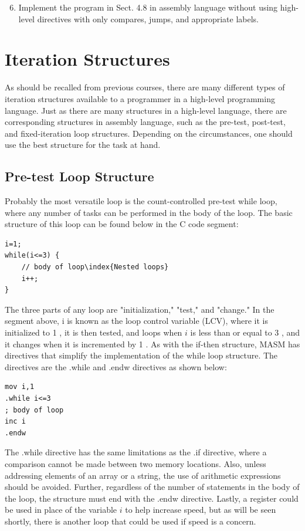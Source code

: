 \documentclass[10pt]{book}
\begin{document}
\begin{enumerate}
  \setcounter{enumi}{5}
  \item Implement the program in Sect. 4.8 in assembly language without using high-level directives with only compares, jumps, and appropriate labels.
\end{enumerate}

\chapter{Iteration Structures}

As should be recalled from previous courses, there are many different types of iteration structures available to a programmer in a high-level programming language. Just as there are many structures in a high-level language, there are corresponding structures in assembly language, such as the pre-test, post-test, and fixed-iteration loop structures. Depending on the circumstances, one should use the best structure for the task at hand.

\section{Pre-test Loop Structure}
Probably the most versatile loop is the count-controlled pre-test while loop, where any number of tasks can be performed in the body of the loop. The basic structure of this loop can be found below in the C code segment:

\begin{verbatim}
i=1;
while(i<=3) {
    // body of loop\index{Nested loops}
    i++;
}
\end{verbatim}

The three parts of any loop are "initialization," "test," and "change." In the segment above, i is known as the loop control variable (LCV), where it is initialized to 1 , it is then tested, and loops when $i$ is less than or equal to 3 , and it changes when it is incremented by 1 . As with the if-then structure, MASM has directives that simplify the implementation of the while loop structure. The directives are the .while and .endw directives as shown below:

\begin{verbatim}
mov i,1
.while i<=3
; body of loop
inc i
.endw
\end{verbatim}

The .while directive has the same limitations as the .if directive, where a comparison cannot be made between two memory locations. Also, unless addressing elements of an array or a string, the use of arithmetic expressions should be avoided. Further, regardless of the number of statements in the body of the loop, the structure must end with the .endw directive. Lastly, a register could be used in place of the variable $i$ to help increase speed, but as will be seen shortly, there is another loop that could be used if speed is a concern.
\end{document}

